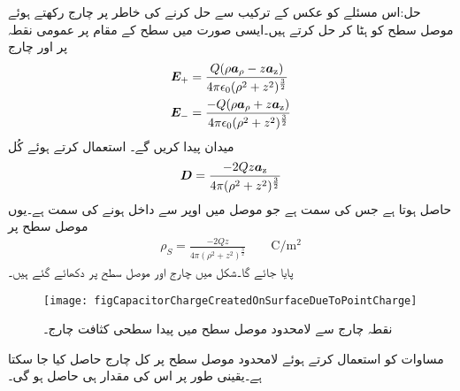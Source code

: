حل:اس مسئلے کو عکس کے ترکیب سے حل کرنے کی خاطر  پر  چارج رکھتے ہوئے موصل سطح کو ہٹا کر حل کرتے ہیں۔ایسی صورت میں سطح کے مقام پر عمومی نقطہ  پر  اور  چارج
\begin{align*}
{\ensuremath{{\boldsymbol{E}}}}_+&=\frac{Q (\rho {\boldsymbol{a}}_{\rho}-z{\boldsymbol{a}}_{\textup{z}})}{4\pi \epsilon_0 (\rho^2+z^2)^{\frac{3}{2}}}\\
{{\boldsymbol{E}}}_-&=\frac{-Q (\rho {\boldsymbol{a}}_{\rho}+z{\boldsymbol{a}}_{\textup{z}})}{4\pi \epsilon_0 (\rho^2+z^2)^{\frac{3}{2}}}
\end{align*}
میدان پیدا کریں گے۔ استعمال کرتے ہوئے  کُل 
\begin{align*}
{\ensuremath{{\boldsymbol{D}}}}=\frac{-2Qz{\boldsymbol{a}}_{\textup{z}}}{4\pi (\rho^2+z^2)^{\frac{3}{2}}}
\end{align*}  
حاصل ہوتا ہے جس کی سمت  ہے جو موصل میں اوپر سے داخل ہونے کی سمت ہے۔یوں موصل سطح پر
\begin{align}\label{مساوات_کپیسٹر_لامحدود_سطح_پر_سطحی_کثافت}
\rho_S=\frac{-2Qz}{4\pi  (\rho^2+z^2)^{\frac{3}{2}}} \quad \quad \si{\coulomb \per \meter \squared}
\end{align}
پایا جائے گا۔شکل  میں چارج  اور موصل سطح پر  دکھائے گئے ہیں۔
\begin{figure}
\centering
\texttt{[image: figCapacitorChargeCreatedOnSurfaceDueToPointCharge]}
\caption{نقطہ چارج سے لامحدود موصل سطح میں پیدا سطحی کثافت  چارج۔}
\label{شکل_کپیسٹر_لامحدود_سطح_پیدا-کثافت_چارج}
\end{figure}

مساوات  کو استعمال کرتے ہوئے  لامحدود موصل سطح پر کل چارج حاصل کیا جا سکتا ہے۔یقینی طور پر اس کی مقدار  ہی حاصل ہو گی۔

